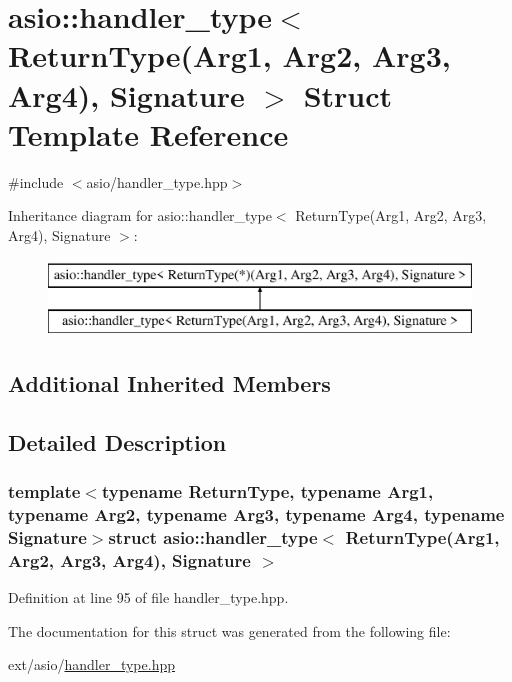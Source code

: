 \hypertarget{structasio_1_1handler__type_3_01_return_type_07_arg1_00_01_arg2_00_01_arg3_00_01_arg4_08_00_01_signature_01_4}{}\section{asio\+:\+:handler\+\_\+type$<$ Return\+Type(Arg1, Arg2, Arg3, Arg4), Signature $>$ Struct Template Reference}
\label{structasio_1_1handler__type_3_01_return_type_07_arg1_00_01_arg2_00_01_arg3_00_01_arg4_08_00_01_signature_01_4}


{\ttfamily \#include $<$asio/handler\+\_\+type.\+hpp$>$}

Inheritance diagram for asio\+:\+:handler\+\_\+type$<$ Return\+Type(Arg1, Arg2, Arg3, Arg4), Signature $>$\+:\begin{figure}[H]
\begin{center}
\leavevmode
\includegraphics[height=2.000000cm]{structasio_1_1handler__type_3_01_return_type_07_arg1_00_01_arg2_00_01_arg3_00_01_arg4_08_00_01_signature_01_4}
\end{center}
\end{figure}
\subsection*{Additional Inherited Members}


\subsection{Detailed Description}
\subsubsection*{template$<$typename Return\+Type, typename Arg1, typename Arg2, typename Arg3, typename Arg4, typename Signature$>$struct asio\+::handler\+\_\+type$<$ Return\+Type(\+Arg1, Arg2, Arg3, Arg4), Signature $>$}



Definition at line 95 of file handler\+\_\+type.\+hpp.



The documentation for this struct was generated from the following file\+:\begin{DoxyCompactItemize}
\item 
ext/asio/\hyperlink{handler__type_8hpp}{handler\+\_\+type.\+hpp}\end{DoxyCompactItemize}
